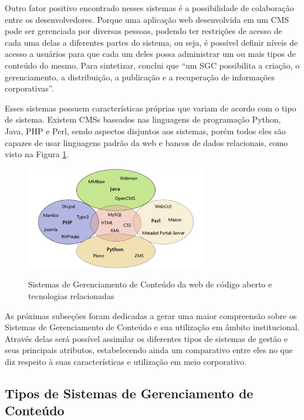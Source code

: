 Outro fator positivo encontrado nesses sistemas é a possibilidade de colaboração entre os desenvolvedores. Porque uma aplicação web desenvolvida em um CMS pode ser gerenciada por diversas pessoas, podendo ter restrições de acesso de cada uma delas a diferentes partes do sistema, ou seja, é possível definir níveis de acesso a usuários para que cada um deles possa administrar um ou mais tipos de conteúdo do mesmo. Para sintetizar,  conclui que ``um SGC possibilita a criação, o gerenciamento, a distribuição, a publicação e a recuperação de informações corporativas''.

Esses sistemas possuem características próprias que variam de acordo com o tipo de sistema. Existem CMSs baseados nas linguagens de programação Python, Java, PHP e Perl, sendo aspectos disjuntos aos sistemas, porém todos eles são capazes de usar linguagens padrão da web e bancos de dados relacionais, como visto na Figura \ref{figura3}.

\begin{figure}[htb]
 \centering
 \caption{Sistemas de Gerenciamento de Conteúdo da web de código aberto e tecnologias relacionadas}
 \includegraphics[width=0.7\textwidth]{figuras/linguagens-cms-1}
 \label{figura3}
\end{figure}

\newpage
As próximas subseções foram dedicadas a gerar uma maior compreensão sobre os Sistemas de Gerenciamento de Conteúdo e sua utilização em âmbito institucional. Através delas será possível assimilar os diferentes tipos de sistemas de gestão e seus principais atributos, estabelecendo ainda um comparativo entre eles no que diz respeito à suas características e utilização em meio corporativo.

\hspace{2.5cm}

\subsection{Tipos de Sistemas de Gerenciamento de Conteúdo}
\label{subsec:tipos-cms}
\hspace{2.5cm}

